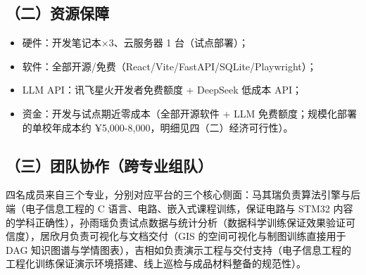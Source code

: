 \documentclass[zihao=-4,a4paper,UTF8,fontset=windows]{ctexart}
\begin{document}
\subsection{（二）资源保障}
\begin{itemize}[leftmargin=2em,itemsep=0pt,topsep=0pt]
\item 硬件：开发笔记本×3、云服务器 1 台（试点部署）；
\end{itemize}
\begin{itemize}[leftmargin=2em,itemsep=0pt,topsep=0pt]
\item 软件：全部开源/免费（React/Vite/FastAPI/SQLite/Playwright）；
\end{itemize}
\begin{itemize}[leftmargin=2em,itemsep=0pt,topsep=0pt]
\item LLM API：讯飞星火开发者免费额度 + DeepSeek 低成本 API；
\end{itemize}
\begin{itemize}[leftmargin=2em,itemsep=0pt,topsep=0pt]
\item 资金：开发与试点期近零成本（全部开源软件 + LLM 免费额度；规模化部署的单校年成本约 ¥5,000-8,000，明细见四（二）经济可行性）。
\end{itemize}
\subsection{（三）团队协作（跨专业组队）}


四名成员来自三个专业，分别对应平台的三个核心侧面：马其瑞负责算法引擎与后端（电子信息工程的 C 语言、电路、嵌入式课程训练，保证电路与 STM32 内容的学科正确性），孙雨瑶负责试点数据与统计分析（数据科学训练保证效果验证可信度），居欣月负责可视化与文档交付（GIS 的空间可视化与制图训练直接用于 DAG 知识图谱与学情图表），吉相如负责演示工程与交付支持（电子信息工程的工程化训练保证演示环境搭建、线上巡检与成品材料整备的规范性）。
\end{document}
